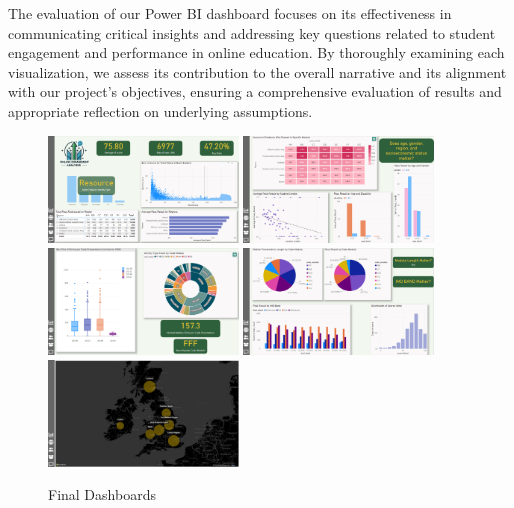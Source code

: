 The evaluation of our Power BI dashboard focuses on its effectiveness in communicating critical insights and addressing key questions related to student engagement and performance in online education. By thoroughly examining each visualization, we assess its contribution to the overall narrative and its alignment with our project's objectives, ensuring a comprehensive evaluation of results and appropriate reflection on underlying assumptions.

\begin{figure}[h!]
    \centering
    \includegraphics[width=0.45\textwidth]{photo/d1.PNG}
    \includegraphics[width=0.45\textwidth]{photo/d2.PNG}\\
    \includegraphics[width=0.45\textwidth]{photo/d3.PNG}
    \includegraphics[width=0.45\textwidth]{photo/d4.PNG}
    \includegraphics[width=0.45\textwidth]{photo/d5.PNG}
    \caption{Final Dashboards}
    \label{fig:multiple-images}
\end{figure}


